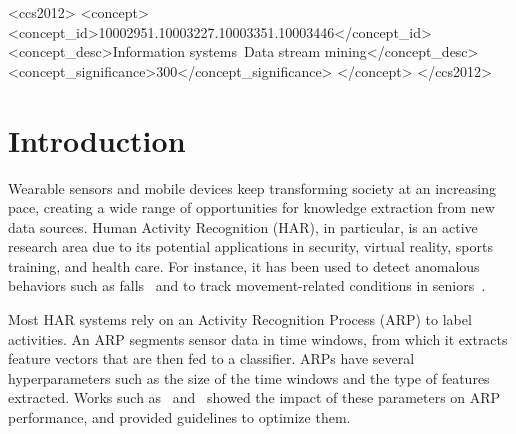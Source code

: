 \documentclass[sigconf]{acmart}
\begin{document}
\begin{CCSXML}
<ccs2012>
<concept>
<concept_id>10002951.10003227.10003351.10003446</concept_id>
<concept_desc>Information systems~Data stream mining</concept_desc>
<concept_significance>300</concept_significance>
</concept>
</ccs2012>
\end{CCSXML}



%


%


%
\maketitle

\section{Introduction}

Wearable sensors and mobile devices keep transforming society at an 
increasing pace, creating a wide range of opportunities for knowledge 
extraction from new data sources. Human Activity Recognition (HAR), in 
particular, is an active research area due to its potential applications in 
security, virtual reality, sports training, and health care. For 
instance, it has been used to detect anomalous behaviors such as 
falls~\cite{bianchi2010barometric} and to track movement-related 
conditions in seniors~\cite{chen2014implementing}.

Most HAR systems rely on an Activity 
Recognition Process (ARP) to label activities. An ARP segments sensor data in
time windows, from which it extracts feature vectors that are then fed to a classifier. ARPs have several hyperparameters such as the size of the time windows and the 
type of features extracted. Works such as~\cite{banos2014window} 
and~\cite{sousa2017comparative} showed the impact of these parameters on 
ARP performance, and provided guidelines to optimize them.
\end{document}
